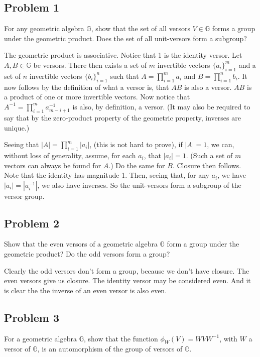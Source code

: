 \documentclass[12pt]{article}
\newcommand{\G}{\mathbb{G}}
\begin{document}
\subsection*{Problem 1}

For any geometric algebra $\G$, show that
the set of all versors $V\in\G$ forms a group under the geometric product.
Does the set of all unit-versors form a subgroup?

The geometric product is associative.
Notice that 1 is the identity versor.  Let $A,B\in\G$ be versors.
There then exists a set of $m$ invertible vectors $\{a_i\}_{i=1}^m$ and
a set of $n$ invertible vectors $\{b_i\}_{i=1}^n$ such that
$A=\prod_{i=1}^m a_i$ and $B=\prod_{i=1}^n b_i$.
It now follows by the definition of what a versor is, that $AB$ is also a versor.
$AB$ is a product of one or more invertible vectors.
Now notice that $A^{-1}=\prod_{i=1}^m a_{m-i+1}^{-1}$ is also, by
definition, a versor.  (It may also be required to say that by the zero-product
property of the geometric property, inverses are unique.)

Seeing that $|A|=\prod_{i=1}^m |a_i|$, (this is not hard to prove), if $|A|=1$, we can, without loss
of generality, assume, for each $a_i$, that $|a_i|=1$.  (Such a set of $m$
vectors can always be found for $A$.)  Do the same for $B$.  Closure then follows.  Note that the identity
has magnitude 1.  Then, seeing that, for any $a_i$, we have $|a_i|=|a_i^{-1}|$,
we also have inverses.  So the unit-versors form a subgroup of the versor group.

\subsection*{Problem 2}

Show that the even versors of a geometric algebra $\G$
form a group under the geometric product?  Do the odd versors form a group?

Clearly the odd versors don't form a group, because we don't have closure.
The even versors give us closure.  The identity versor may be considered even.
And it is clear the the inverse of an even versor is also even.

\subsection*{Problem 3}

For a geometric algebra $\G$, show that
the function $\phi_W(V)=WVW^{-1}$, with $W$ a versor of $\G$,
is an automorphism of the group of versors of $\G$.
\end{document}
